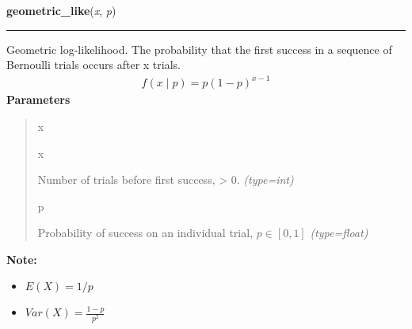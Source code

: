 \hspace{.8\funcindent}\begin{boxedminipage}{\funcwidth}

    \raggedright \textbf{geometric\_like}(\textit{x}, \textit{p})

    \vspace{-1.5ex}

    \rule{\textwidth}{1pt}
\setlength{\parskip}{2ex}

Geometric log-likelihood. The probability that the first success in a
sequence of Bernoulli trials occurs after x trials.
\begin{equation*}\begin{split}f(x \mid p) = p(1-p)^{x-1}\end{split}\end{equation*}\setlength{\parskip}{1ex}
      \textbf{Parameters}
      \vspace{-1ex}

      \begin{quote}
        \begin{Ventry}{x}

          \item[x]


Number of trials before first success, {\textgreater} 0.
            {\it (type=int)}

          \item[p]


Probability of success on an individual trial, $p \in [0,1]$
            {\it (type=float)}

        \end{Ventry}

      \end{quote}

\textbf{Note:} \begin{itemize}
\item {} 
$E(X)=1/p$

\item {} 
$Var(X)=\frac{1-p}{p^2}$

\end{itemize}


    \end{boxedminipage}

    \label{pymc:distributions:gev_like}

    \vspace{0.5ex}

